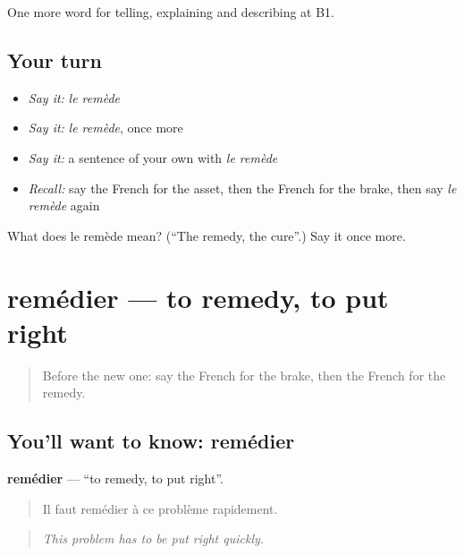 \begin{grammarlens}[title={What you've built}]
One more word for telling, explaining and describing at B1.
\end{grammarlens}

\subsection*{Your turn}
\begin{itemize}
\raggedright
  \item \emph{Say it:} \emph{le remède}
  \item \emph{Say it:} \emph{le remède}, once more
  \item \emph{Say it:} a sentence of your own with \emph{le remède}
  \item \emph{Recall:} say the French for the asset, then the French for the brake, then say \emph{le remède} again
\end{itemize}

\begin{tcolorbox}[breakable,colback=teal!4,colframe=teal!35!black,title={Before you move on}]
What does le remède mean? (\textquotedblleft{}The remedy, the cure\textquotedblright{}.) Say it once more.
\end{tcolorbox}
\section[remédier]{remédier — to remedy, to put right}

\label{lesson:FR-C353-remedier}



\begin{quote}
Before the new one: say the French for the brake, then the French for the remedy.
\end{quote}

\subsection*{You'll want to know: remédier}
\textbf{remédier} — \textquotedblleft{}to remedy, to put right\textquotedblright{}.

\begin{quote}
Il faut remédier à ce problème rapidement.
\end{quote}

\begin{quote}
\emph{This problem has to be put right quickly.}
\end{quote}

